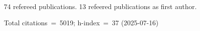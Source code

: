 74 refereed publications. 13 refeered publications as first author.

Total citations~=~5019; h-index~=~37 (2025-07-16)